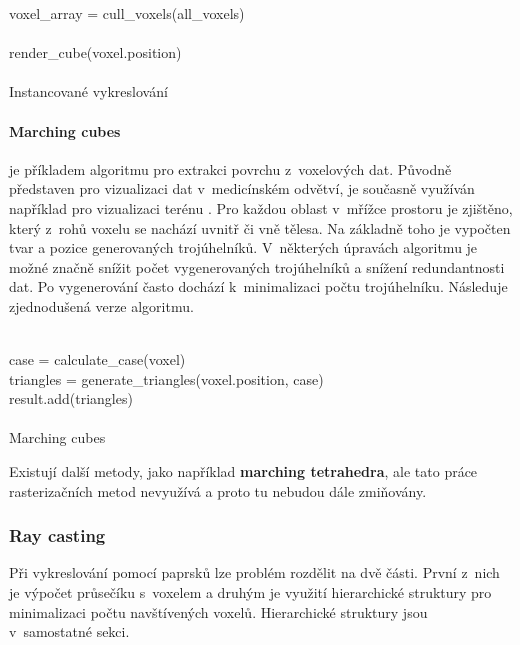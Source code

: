 \begin{center}
	\begin{czechalgorithm}[H] \label{alg:instanced_cube}
		voxel\_array = cull\_voxels(all\_voxels)\\
		 {\\
			render\_cube(voxel.position)\\
		}\\
		\caption{Instancované vykreslování}
	\end{czechalgorithm}
\end{center}

\paragraph{Marching cubes \cite{marching_cubes}} je příkladem algoritmu pro extrakci povrchu z~voxelových dat. Původně představen pro vizualizaci dat v~medicínském odvětví, je současně využíván například pro vizualizaci terénu \cite{nguyen_2008}. Pro každou oblast v~mřížce prostoru je zjištěno, který z~rohů voxelu se nachází uvnitř či vně tělesa. Na základně toho je vypočten tvar a pozice generovaných trojúhelníků. V~některých úpravách algoritmu je možné značně snížit počet vygenerovaných trojúhelníků a snížení redundantnosti dat. Po vygenerování často dochází k~minimalizaci počtu trojúhelníku. Následuje zjednodušená verze algoritmu.

\begin{center}
	\begin{czechalgorithm}[H] \label{alg:marching_cubes}
		 {\\
			case = calculate\_case(voxel)\\
			triangles = generate\_triangles(voxel.position, case)\\
			result.add(triangles)\\
		}\\
		\caption{Marching cubes}
	\end{czechalgorithm}
\end{center}

Existují další metody, jako například \textbf{marching tetrahedra}, ale tato práce rasterizačních metod nevyužívá a proto tu nebudou dále zmiňovány.

\subsubsection{Ray casting} \label{sec:voxel_intersection}
Při vykreslování pomocí paprsků lze problém rozdělit na dvě části. První z~nich je výpočet průsečíku s~voxelem a druhým je využití hierarchické struktury pro minimalizaci počtu navštívených voxelů. Hierarchické struktury jsou v~samostatné sekci.

